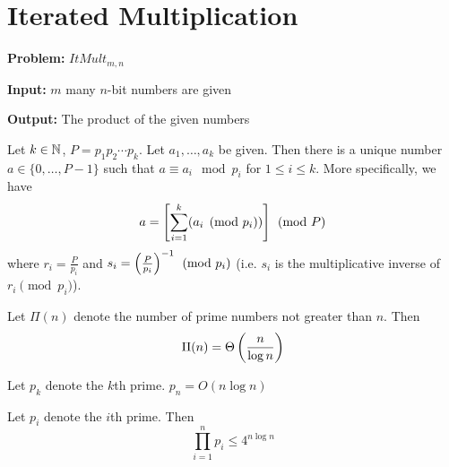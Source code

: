 \section{Iterated Multiplication}
\parinf
\textbf{Problem:} $ItMult_{m,n}$

\textbf{Input:} $m$ many $n$-bit numbers are given

\textbf{Output:} The product of the given numbers

\parinn
\begin{theorem}\label{crt}
	Let $k\in \mathbb{N}$, $P=p_1p_2\cdots p_k$. Let $a_1,\dots, a_k$ be given. Then there is a unique number $a\in \{0,\dots, P-1\}$ such that $a\equiv a_i\mod{p_i}$ for $1\leq i\leq k$. More specifically, we have $$a=\left[ \sum_{i=1}^k (a_i\pmod{p_i}) \right]\pmod{P}$$where $r_i=\frac{P}{p_i}$ and $s_i=\left(\frac{P}{p_i}\right)^{-1} \pmod{p_i}$ (i.e. $s_i$ is the multiplicative inverse of $r_i\pmod{p_i}$).
\end{theorem}
\begin{theorem}
	Let $\Pi(n)$ denote the number of prime numbers not greater than $n$. Then $$\Pi(n)=\Theta\left( \frac{n}{\log n}\right)$$
\end{theorem}
\begin{corollary}\label{approxpn}
	Let $p_k$ denote the $k$th prime. $p_n=O(n\log n)$
\end{corollary}
\begin{theorem}
	Let $p_i$ denote the $i$th prime. Then $$\prod_{i=1}^n p_i\leq 4^{n\log n}$$
\end{theorem}


